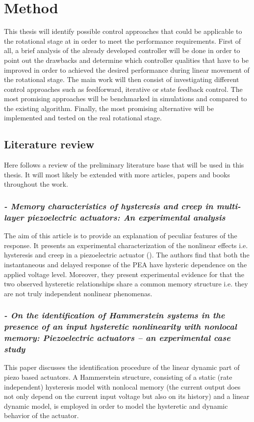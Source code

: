 \chapter{Method}\label{cha:method}
This thesis will identify possible control approaches that could be applicable to the rotational stage at \abbrCERN in order to meet the performance requirements.
First of all, a brief analysis of the already developed controller will be done in order to point out the drawbacks and determine which controller qualities that have to be improved in order to achieved the desired performance during linear movement of the rotational stage. The main work will then consist of investigating different control approaches such as feedforward, iterative or state feedback control. The most promising approaches will be benchmarked in simulations and compared to the existing algorithm. Finally, the most promising alternative will be implemented and tested on the real rotational stage.

\section{Literature review}
Here follows a review of the preliminary literature base that will be used in this thesis. It will most likely be extended with more articles, papers and books throughout the work.

\subsection*{\citep*{Biggio:2014} {\small \emph{- Memory characteristics of hysteresis and creep in multi-layer piezoelectric actuators: An experimental analysis}}}
The aim of this article is to provide an explanation of peculiar features of the \abbrPEA response. It presents an experimental characterization of the nonlinear effects i.e. hysteresis and creep in a piezoelectric actuator (\abbrPEA). The authors find that both the instantaneous and delayed response of the PEA have hysteric dependence on the applied voltage level.
Moreover, they present experimental evidence for that the two observed hysteretic relationships share a common memory structure i.e. they are not truly independent nonlinear phenomenas.

\subsection*{\citep*{ButcherIdentification:2015}{\small \emph{- On the identification of Hammerstein systems in the presence of an input hysteretic nonlinearity with nonlocal memory: Piezoelectric actuators – an experimental case study}}}
This paper discusses the identification procedure of the linear dynamic part of piezo based actuators. A Hammerstein structure, consisting of a static (rate independent) hysteresis model with nonlocal memory (the current output does not only depend on the current input voltage but also on its history) and a linear dynamic model, is employed in order to model the hysteretic and dynamic behavior of the actuator.

